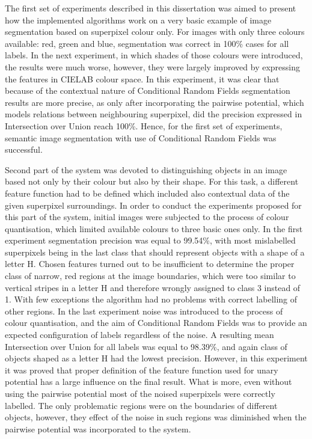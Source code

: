 The first set of experiments described in this dissertation was aimed to present how the implemented algorithms work on a very basic example of image segmentation based on superpixel colour only. For images with only three colours available: red, green and blue, segmentation was correct in 100\% cases for all labels. In the next experiment, in which shades of those colours were introduced, the results were much worse, however, they were largely improved by expressing the features in CIELAB colour space. In this experiment, it was clear that because of the contextual nature of Conditional Random Fields segmentation results are more precise, as only after incorporating the pairwise potential, which models relations between neighbouring superpixel, did the precision expressed in Intersection over Union reach 100\%. Hence, for the first set of experiments, semantic image segmentation with use of Conditional Random Fields was successful. 

Second part of the system was devoted to distinguishing objects in an image based not only by their colour but also by their shape. For this task, a different feature function had to be defined which included also contextual data of the given superpixel surroundings. In order to conduct the experiments proposed for this part of the system, initial images were subjected to the process of colour quantisation, which limited available colours to three basic ones only. In the first experiment segmentation precision was equal to 99.54\%, with most mislabelled superpixels being in the last class that should represent objects with a shape of a letter H. Chosen features turned out to be insufficient to determine the proper class of narrow, red regions at the image boundaries, which were too similar to vertical stripes in a letter H and therefore wrongly assigned to class 3 instead of 1. With few exceptions the algorithm had no problems with correct labelling of other regions. In the last experiment noise was introduced to the process of colour quantisation, and the aim of Conditional Random Fields was to provide an expected configuration of labels regardless of the noise. A resulting mean Intersection over Union for all labels was equal to 98.39\%, and again class of objects shaped as a letter H had the lowest precision. However, in this experiment it was proved that proper definition of the feature function used for unary potential has a large influence on the final result. What is more, even without using the pairwise potential most of the noised superpixels were correctly labelled. The only problematic regions were on the boundaries of different objects, however, they effect of the noise in such regions was diminished when the pairwise potential was incorporated to the system.   

